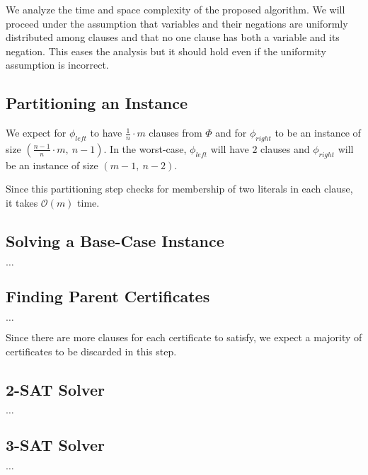 We analyze the time and space complexity of the proposed algorithm.
We will proceed under the assumption that variables and their negations are uniformly distributed among clauses and that no one clause has both a variable and its negation.
This eases the analysis but it should hold even if the uniformity assumption is incorrect.


\subsection{Partitioning an Instance}
\label{subsec:partitioning-an-instance2}

We expect for $\phi_{left}$ to have $\frac{1}{n} \cdot m$ clauses from $\Phi$ and for $\phi_{right}$ to be an instance of size $(\frac{n - 1}{n} \cdot m,~ n - 1)$.
In the worst-case, $\phi_{left}$ will have $2$ clauses and $\phi_{right}$ will be an instance of size $(m - 1,~ n - 2)$.

Since this partitioning step checks for membership of two literals in each clause, it takes $\mathcal{O}(m)$ time.


\subsection{Solving a Base-Case Instance}
\label{subsec:solving-a-base-case-instance2}

$\dots$


\subsection{Finding Parent Certificates}
\label{subsec:finding-parent-certificates2}

$\dots$

Since there are more clauses for each certificate to satisfy, we expect a majority of certificates to be discarded in this step.


\subsection{2-SAT Solver}
\label{subsec:2-sat-solver2}

$\dots$


\subsection{3-SAT Solver}
\label{subsec:3-sat-solver2}

$\dots$
